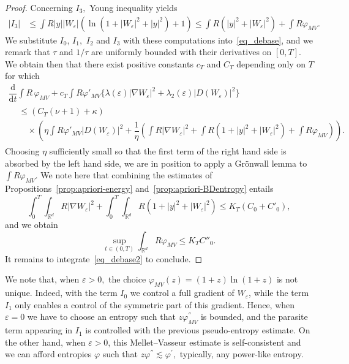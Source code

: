 \documentclass[AHL,Unicode,longabstracts]{cedram}
\newcommand*\R{\mathbb{R}}
\newcommand*\dd {\mathrm{d}}
\newcommand*\<{\left\langle}
\renewcommand*\>{\right\rangle}
\renewcommand*\le{\leqslant}
\newcommand*\eps{\varepsilon}
\begin{document}
\begin{proof}
Concerning $I_3,$ Young inequality yields
\begin{align*}
|I_3| & \le \int R |y| |W_\eps| \left(\ln\left(1+|W_\eps|^2 + |y|^2\right) + 1\right)
\le \int R \left(|y|^2 + |W_\eps|^2\right) + \int R \varphi_{MV}.
\end{align*}
We substitute $I_0$, $I_1,$ $I_2$ and $I_3$ with these computations into~\eqref{eq_debase}, and we remark that $\tau$ and $1/\tau$ are uniformly bounded with their derivatives on $[0,T].$ We obtain then that there exist positive constants $c_{T}$ and $C_T$ depending only on $T$ for which
\begin{multline}\label{eq_debase2}
\dfrac{\dd }{\dd t}\int R \, \varphi_{MV} + c_T \int R \varphi'_{MV} \{ \lambda(\eps) |\nabla W_\eps|^2 + \lambda_2(\eps) |D(W_\eps)|^2 \}\\
\begin{aligned}
&\le \left(C_T(\nu +1) + \kappa\right) \\
&\quad\times\!\left(\eta\!\int\! R \varphi'_{MV}|D(W_\eps)|^2 +
\dfrac{1}{\eta} \left(\int\! R|\nabla W_\eps|^2 + \int\! R(1+|y|^2 +|W_\eps|^2) + \int\! R \varphi_{MV} \right) \right)\!.
\end{aligned}
\end{multline}
Choosing $\eta$ sufficiently small so that the first term of the right hand side is absorbed by the left hand side, we are in position to apply a Gr\"onwall lemma to $\int R \varphi_{MV}.$ We note here that combining the estimates of Propositions~\ref{prop:apriori-energy} and~\ref{prop:apriori-BDentropy} entails
\[
\int_0^T \!\int_{\R^d} R |\nabla W_\eps|^2 + \int_0^T \! \int_{\R^d} R(1 +|y|^2 + |W_\eps|^2) \le K_T (C_0 + C'_0),
\]
and we obtain
\[
\sup_{t \in (0,T)} \int_{\R^d} R \varphi_{MV} \le K_T C''_0.
\]
It remains to integrate~\eqref{eq_debase2} to conclude.
\end{proof}

\begin{rema}
We note that, when $\varepsilon >0,$ the choice $\varphi_{MV}(z) = (1+z)\ln(1+z)$ is not unique. Indeed, with the term $I_0$ we control a full gradient of $W_{\varepsilon}$, while the term $I_1$ only enables a control of the symmetric part of this gradient. Hence, when $\varepsilon =0$ we have to choose an entropy such that $z
\varphi^{''}_{MV}$ is bounded, and the parasite term appearing in $I_1$ is controlled with the previous pseudo-entropy estimate. On the other hand, when $\varepsilon >0$, this Mellet--Vasseur estimate is self-consistent and we can afford entropies $\varphi$ such that $z \varphi^{''} \lesssim \varphi^{'},$ typically, any power-like entropy.
\end{rema}
\end{document}
